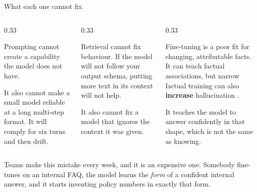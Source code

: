 \documentclass[aspectratio=169,10pt]{beamer}
\begin{document}
\fi
\begin{frame}{What each one cannot fix}
  \begin{columns}[T]
    \begin{column}{0.33\textwidth}
      \begin{block}{Prompting cannot}
        \small
        create a capability the model does not have.
        \vspace{0.3em}

        It also cannot make a small model reliable at a long multi-step
        format. It will comply for six turns and then drift.
      \end{block}
    \end{column}
    \begin{column}{0.33\textwidth}
      \begin{block}{Retrieval cannot}
        \small
        fix behaviour. If the model will not follow your output schema,
        putting more text in its context will not help.
        \vspace{0.3em}

        It also cannot fix a model that ignores the context it was given.
      \end{block}
    \end{column}
    \begin{column}{0.33\textwidth}
      \begin{block}{Fine-tuning is a poor fit for}
        \small
        changing, attributable facts. It can teach factual associations, but
        narrow factual training can also \textbf{increase} hallucination
        .
        \vspace{0.3em}

        It teaches the model to answer confidently in that shape, which is not
        the same as knowing.
      \end{block}
    \end{column}
  \end{columns}
  \vspace{0.6em}
  \centering
  \vspace{0.3em}

  \raggedright
  \small
  Teams make this mistake every week, and it is an expensive one. Somebody
  fine-tunes on an internal FAQ, the model learns the \emph{form} of a
  confident internal answer, and it starts inventing policy numbers in exactly
  that form.
\end{frame}
\end{document}
